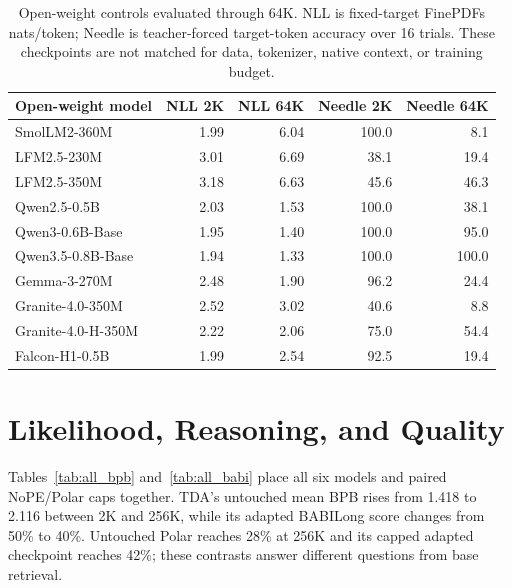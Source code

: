 \begin{table}[h]
\centering
\scriptsize
\setlength{\tabcolsep}{3.4pt}
\begin{tabular}{lrrrr}
\toprule
\textbf{Open-weight model} & \textbf{NLL 2K} & \textbf{NLL 64K} & \textbf{Needle 2K} & \textbf{Needle 64K} \\
\midrule
SmolLM2-360M & 1.99 & 6.04 & 100.0 & 8.1 \\
LFM2.5-230M & 3.01 & 6.69 & 38.1 & 19.4 \\
LFM2.5-350M & 3.18 & 6.63 & 45.6 & 46.3 \\
Qwen2.5-0.5B & 2.03 & 1.53 & 100.0 & 38.1 \\
Qwen3-0.6B-Base & 1.95 & 1.40 & 100.0 & 95.0 \\
Qwen3.5-0.8B-Base & 1.94 & 1.33 & 100.0 & 100.0 \\
Gemma-3-270M & 2.48 & 1.90 & 96.2 & 24.4 \\
Granite-4.0-350M & 2.52 & 3.02 & 40.6 & 8.8 \\
Granite-4.0-H-350M & 2.22 & 2.06 & 75.0 & 54.4 \\
Falcon-H1-0.5B & 1.99 & 2.54 & 92.5 & 19.4 \\
\bottomrule
\end{tabular}
\caption{Open-weight controls evaluated through 64K. NLL is fixed-target FinePDFs nats/token; Needle is teacher-forced target-token accuracy over 16 trials. These checkpoints are not matched for data, tokenizer, native context, or training budget.}
\label{table:open_weight_controls}
\end{table}

\section{Likelihood, Reasoning, and Quality}
\label{appendix:quality}

Tables~\ref{tab:all_bpb} and~\ref{tab:all_babi} place all six models and paired NoPE/Polar caps together. TDA's untouched mean BPB rises from 1.418 to 2.116 between 2K and 256K, while its adapted BABILong score changes from 50\% to 40\%. Untouched Polar reaches 28\% at 256K and its capped adapted checkpoint reaches 42\%; these contrasts answer different questions from base retrieval.




